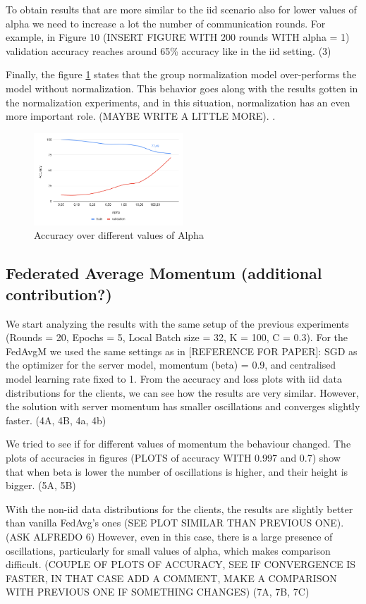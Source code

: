 \documentclass[twocolumn]{article}
\begin{document}
To obtain results that are more similar to the iid scenario also for lower values of alpha we need to increase a lot the number of communication rounds. For example, in Figure 10 (INSERT FIGURE WITH 200 rounds WITH alpha = 1) validation accuracy reaches around 65\% accuracy like in the iid setting.
(3)

Finally, the figure \ref{AccAlpha} states that the group normalization model over-performs the model without normalization. This behavior goes along with the results gotten in the normalization experiments, and in this situation, normalization has an even more important role. (MAYBE WRITE A LITTLE MORE).
.


\begin{figure}
    \centering
    \includegraphics[width=0.5\textwidth,height=.3\textheight]{alphaAccuracy.png}
    \caption{Accuracy over different values of Alpha}
    \label{AccAlpha} 
\end{figure}


\subsection{Federated Average Momentum (additional contribution?)}
We start analyzing the results with the same setup of the previous experiments (Rounds = 20, Epochs = 5, Local Batch size = 32, K = 100, C = 0.3).
For the FedAvgM we used the same settings as in [REFERENCE FOR PAPER]: SGD as the optimizer for the server model,  momentum (beta) = 0.9, and centralised model learning rate fixed to 1.
From the accuracy and loss plots with iid data distributions for the clients, we can see how the results are very similar. However, the solution with server momentum has smaller oscillations and converges slightly faster. 
(4A, 4B, 4a, 4b)

We tried to see if for different values of momentum the behaviour changed. The plots of accuracies in figures (PLOTS of accuracy WITH 0.997 and 0.7) show that when beta is lower the number of oscillations is higher, and their height is bigger.
(5A, 5B)

With the non-iid data distributions for the clients, the results are slightly better than vanilla FedAvg's ones (SEE PLOT SIMILAR THAN PREVIOUS ONE). 
(ASK ALFREDO 6)
However, even in this case, there is a large presence of oscillations, particularly for small values of alpha, which makes comparison difficult.
(COUPLE OF PLOTS OF ACCURACY, SEE IF CONVERGENCE IS FASTER, IN THAT CASE ADD A COMMENT, MAKE A COMPARISON WITH PREVIOUS ONE IF SOMETHING CHANGES)
(7A, 7B, 7C)
\end{document}
